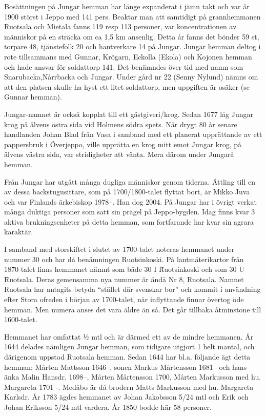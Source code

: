 Bosättningen på Jungar hemman har länge expanderat i jämn takt och var år 1900 störst i Jeppo med 141 pers. Beaktar man att samtidigt på grannhemmanen Ruotsala och Mietala fanns 119 resp 113 personer, var koncentrationen av människor på en sträcka om ca 1,5 km ansenlig. Detta år fanns det bönder 59 st, torpare 48, tjänstefolk 20 och hantverkare 14 på Jungar. Jungar hemman deltog i rote tillsammans med Gunnar, Krögarn, Eckolla (Ekola) och Kojonen hemman och hade ansvar för soldattorp 141. Det benämndes över tid med namn som Snarubacka,Nårrbacka och Jungar. Under gård nr 22 (Senny Nylund) nämns om att den platsen skulle ha hyst ett litet soldattorp, men uppgiften är osäker (se Gunnar hemman).

Jungar-namnet är också kopplat till ett gästgiveri/krog. Sedan 1677 låg Jungar krog på älvens östra sida vid Holmens södra spets. När  drygt 80 år senare handlanden Johan Blad från Vasa i samband med ett planerat upprättande av ett pappersbruk i Överjeppo, ville upprätta en krog mitt emot Jungar krog,  på älvens västra sida, var stridigheter att vänta. Mera därom under Jungarå hemman.

Från Jungar har utgått många dugliga människor genom tiderna. Ättling till en av dessa backstugusittare, som på 1700/1800-talet flyttat bort, är Mikko Juva och var Finlands ärkebiskop 1978--. Han dog 2004. På Jungar har i övrigt verkat många duktiga personer som satt sin prägel på Jeppo-bygden. Idag finns kvar 3 aktiva brukningsenheter på detta hemman, som fortfarande har kvar sin agrara karaktär.



I samband med storskiftet i slutet av 1700-talet noteras hemmanet under nummer 30 och har då benämningen Ruotsinkoski. På lantmäterikartor från 1870-talet finns hemmanet nämnt som både 30 I \= Ruotsinkoski och som 30 U \= Ruotsala. Deras gemensamma nya nummer är ändå Nr 8, Ruotsala. Namnet Ruotsala har antagits betyda ``stället där svenskar bor'' och kommit i användning efter Stora ofreden i början av 1700-talet, när inflyttande finnar övertog öde hemman. Men numera anses det vara äldre än så. Det går tillbaka åtminstone till 1600-talet.

Hemmanet har omfattat ½ mtl och är därmed ett av de mindre hemmanen. År 1644 delades nämligen Jungar hemman, som tidigare utgjort 1 helt mantal, och därigenom uppstod Ruotsala hemman. Sedan 1644 har bl.a. följande ägt detta hemman:
Mårten Mattsson 1646--, sonen Markus Mårtensson 1681-- och hans änka Malin Hansdr. 1698--, Mårten Mårtensson  1700, Mårten Markusson med hu. Margareta 1701 -. Medåbo är då brodern Matts Markusson med hu. Margareta Karlsdr. År 1783 ägdes hemmanet av Johan Jakobsson 5/24 mtl och Erik och Johan Eriksson 5/24 mtl vardera. År 1850 bodde här 58 personer.

